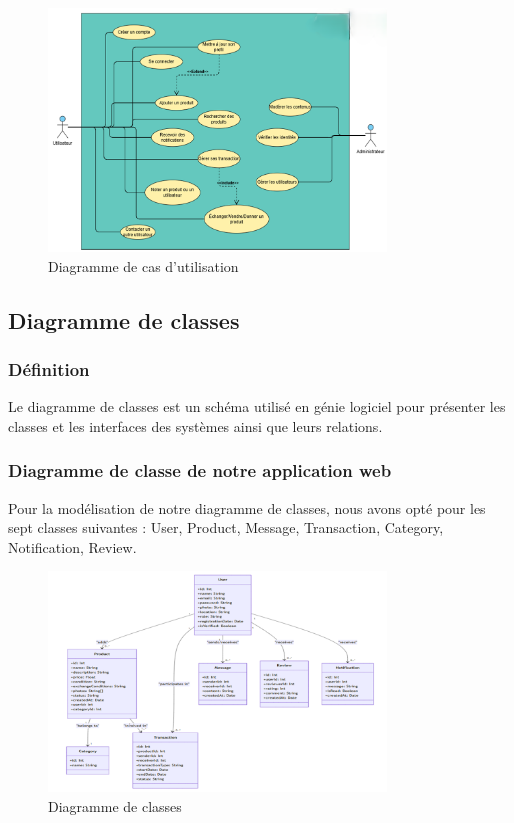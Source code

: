 \documentclass[12pt,a4paper]{report}
\begin{document}
	\begin{figure}[H]
		\centering
		\includegraphics[width=0.8\textwidth]{images/use_case.png}
		\caption{Diagramme de cas d'utilisation}
		\label{fig:cas_utilisation}
	\end{figure}
	
	\subsection{Diagramme de classes}
	\subsubsection{Définition}
	Le diagramme de classes est un schéma utilisé en génie logiciel pour présenter les classes et les interfaces des systèmes ainsi que leurs relations.
	
	\subsubsection{Diagramme de classe de notre application web}
	Pour la modélisation de notre diagramme de classes, nous avons opté pour les sept classes suivantes : User, Product, Message, Transaction, Category, Notification, Review.
	
	\begin{figure}[H]
		\centering
		\includegraphics[width=0.8\textwidth]{images/class_diagram.png}
		\caption{Diagramme de classes}
		\label{fig:diagramme_classes}
	\end{figure}
	
\end{document}
